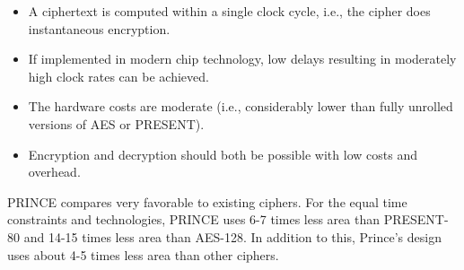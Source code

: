 \documentclass{transcrypto}
\begin{document}
\begin{itemize}
    \item A ciphertext is computed within a single clock cycle, i.e., the cipher does instantaneous encryption.
\item If implemented in modern chip technology, low delays resulting in moderately
high clock rates can be achieved.
\item The hardware costs are moderate (i.e., considerably lower than fully unrolled
versions of AES or PRESENT).
\item Encryption and decryption should both be possible with low costs and overhead.
\end{itemize}
PRINCE compares very favorable to existing ciphers. For the
equal time constraints and technologies, PRINCE uses 6-7 times less area than PRESENT-80 and 14-15 times less area than AES-128. In addition to this,
Prince's design uses about 4-5 times less area than other ciphers.
\end{document}
